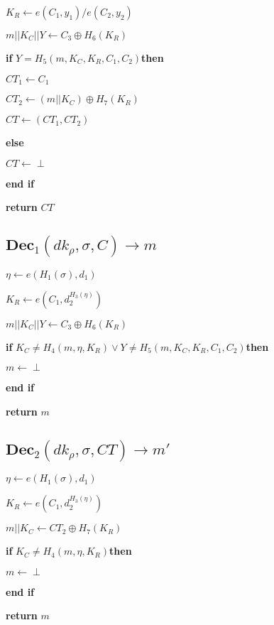 \documentclass[a4paper]{article}
\begin{document}
$K_R \gets e(C_1, y_1) / e(C_2, y_2)$

$m || K_C || Y \gets C_3 \oplus H_6(K_R)$

\textbf{if} $Y = H_5(m, K_C, K_R, C_1, C_2) $\textbf{then}

\quad$\textit{CT}_1 \gets C_1$

\quad$\textit{CT}_2 \gets (m || K_C) \oplus H_7(K_R)$

\quad$\textit{CT} \gets (\textit{CT}_1, \textit{CT}_2)$

\textbf{else}

\quad$\textit{CT} \gets \perp$

\textbf{end if}

\textbf{return} $\textit{CT}$

\subsection{$\textbf{Dec}_1(\textit{dk}_\rho, \sigma, C) \rightarrow m$}

$\eta \gets e(H_1(\sigma), d_1)$

$K_R \gets e(C_1, d_2^{H_3(\eta)})$

$m || K_C || Y \gets C_3 \oplus H_6(K_R)$

\textbf{if} $K_C \neq H_4(m, \eta, K_R) \lor Y \neq H_5(m, K_C, K_R, C_1, C_2) $\textbf{then}

\quad$m \gets \perp$

\textbf{end if}

\textbf{return} $m$

\subsection{$\textbf{Dec}_2(\textit{dk}_\rho, \sigma, \textit{CT}) \rightarrow m'$}

$\eta \gets e(H_1(\sigma), d_1)$

$K_R \gets e(C_1, d_2^{H_3(\eta)})$

$m || K_C \gets \textit{CT}_2 \oplus H_7(K_R)$

\textbf{if} $K_C \neq H_4(m, \eta, K_R) $\textbf{then}

\quad$m \gets \perp$

\textbf{end if}

\textbf{return} $m$
\end{document}
